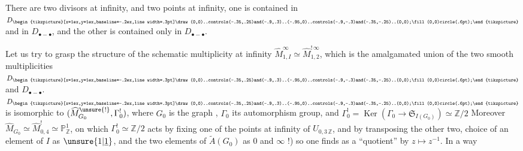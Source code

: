 There are two divisors at infinity,  and two  points at infinity,  one  is contained in $D_{\begin{tikzpicture}[x=1ex,y=1ex,baseline=-.2ex,line width=.3pt]\draw (0,0)..controls(-.35,.25)and(-.9,.3)..(-.95,0)..controls(-.9,-.3)and(-.35,-.25)..(0,0);\fill(0,0)circle(.6pt);\end{tikzpicture}}$ and in $D_{\bullet-\bullet}$, and the other is contained only in $D_{\bullet-\bullet}$.

Let us try to  grasp the structure of the schematic multiplicity at infinity $\widehat M^\infty_{1,I}\simeq\widehat M^{!\,\infty}_{1,2}$, which is the amalgamated union of the two smooth multiplicities  $D_{\begin{tikzpicture}[x=1ex,y=1ex,baseline=-.2ex,line width=.3pt]\draw (0,0)..controls(-.35,.25)and(-.9,.3)..(-.95,0)..controls(-.9,-.3)and(-.35,-.25)..(0,0);\fill(0,0)circle(.6pt);\end{tikzpicture}}$ and $D_{\bullet-\bullet}$.
$D_{\begin{tikzpicture}[x=1ex,y=1ex,baseline=-.2ex,line width=.3pt]\draw (0,0)..controls(-.35,.25)and(-.9,.3)..(-.95,0)..controls(-.9,-.3)and(-.35,-.25)..(0,0);\fill(0,0)circle(.6pt);\end{tikzpicture}}$ is isomorphic to $(\widehat M^{\unsure{!}}_{G_0},\Gamma^!_0)$, where $G_0$ is the graph
,
$\Gamma_0$ its automorphism group, and $\Gamma^!_0=\operatorname{Ker}(\Gamma_0\longrightarrow\mathfrak S_{I(G_0)})\simeq\mathbb Z/2$
Moreover $\widehat M_{G_0}\simeq\widehat M^!_{0,4}\simeq\mathbb P^1_{\mathbb Z}$, on which $\Gamma^!_0\simeq\mathbb Z/2$ acts by fixing one of the  points at infinity of $U_{0,3\,\mathbb Z}$,  and by transposing the other two,    choice of an element of $I$ as $\unsure{1|\underline 1}$, and the two elements of $\widetilde A(G_0)$ as $0$ and $\infty$ !) so one finds as a ``quotient'' by $z\longmapsto z^{-1}$. In a way
